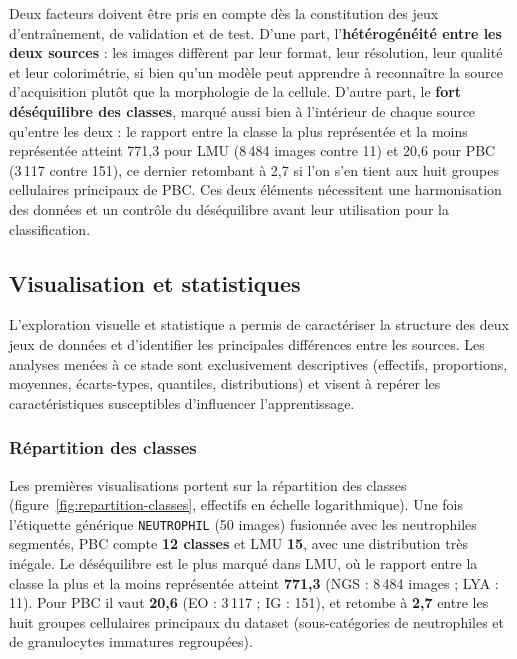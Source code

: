 Deux facteurs doivent être pris en compte dès la constitution des jeux d’entraînement, de validation et de test.
D’une part, l’\textbf{hétérogénéité entre les deux sources} : les images diffèrent par leur format, leur résolution, leur qualité et leur colorimétrie, si bien qu’un modèle peut apprendre à reconnaître la source d’acquisition plutôt que la morphologie de la cellule.
D’autre part, le \textbf{fort déséquilibre des classes}, marqué aussi bien à l’intérieur de chaque source qu’entre les deux : le rapport entre la classe la plus représentée et la moins représentée atteint 771,3 pour LMU (8\,484 images contre 11) et 20,6 pour PBC (3\,117 contre 151), ce dernier retombant à 2,7 si l’on s’en tient aux huit groupes cellulaires principaux de PBC.
Ces deux éléments nécessitent une harmonisation des données et un contrôle du déséquilibre avant leur utilisation pour la classification.

\subsection{Visualisation et statistiques}

L’exploration visuelle et statistique a permis de caractériser la structure des deux jeux de données et d’identifier les principales différences entre les sources.
Les analyses menées à ce stade sont exclusivement descriptives (effectifs, proportions, moyennes, écarts-types, quantiles, distributions) et visent à repérer les caractéristiques susceptibles d’influencer l’apprentissage.

\subsubsection*{Répartition des classes}

Les premières visualisations portent sur la répartition des classes (figure~\ref{fig:repartition-classes}, effectifs en échelle logarithmique).
Une fois l’étiquette générique \texttt{NEUTROPHIL} (50 images) fusionnée avec les neutrophiles segmentés, PBC compte \textbf{12 classes} et LMU \textbf{15}, avec une distribution très inégale.
Le déséquilibre est le plus marqué dans LMU, où le rapport entre la classe la plus et la moins représentée atteint \textbf{771,3} (NGS : 8\,484 images ; LYA : 11).
Pour PBC il vaut \textbf{20,6} (EO : 3\,117 ; IG : 151), et retombe à \textbf{2,7} entre les huit groupes cellulaires principaux du dataset (sous-catégories de neutrophiles et de granulocytes immatures regroupées).

